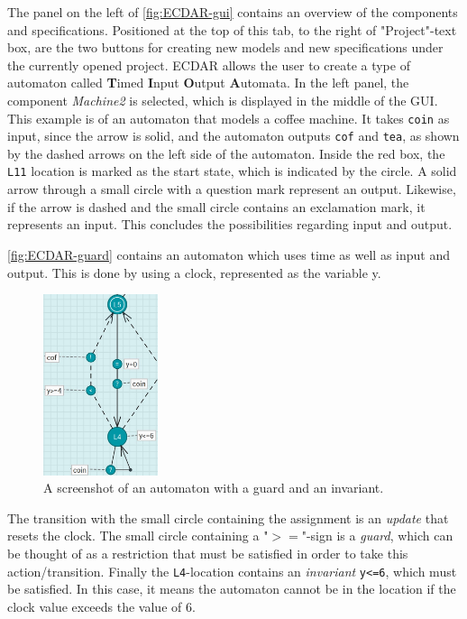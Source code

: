 The panel on the left of \autoref{fig:ECDAR-gui} contains an overview of the components and specifications. 
Positioned at the top of this tab, to the right of "Project"-text box, are the two buttons for creating new models and new specifications under the currently opened project.
ECDAR allows the user to create a type of automaton called \textbf{T}imed \textbf{I}nput \textbf{O}utput \textbf{A}utomata. 
In the left panel, the component \textit{Machine2} is selected, which is displayed in the middle of the GUI.
This example is of an automaton that models a coffee machine.
It takes \texttt{coin} as input, since the arrow is solid, and the automaton outputs \texttt{cof} and \texttt{tea}, as shown by the dashed arrows on the left side of the automaton.
Inside the red box, the \texttt{L11} location is marked as the start state, which is indicated by the circle.
A solid arrow through a small circle with a question mark represent an output. 
Likewise, if the arrow is dashed and the small circle contains an exclamation mark, it represents an input.
This concludes the possibilities regarding input and output.

\autoref{fig:ECDAR-guard} contains an automaton which uses time as well as input and output.
This is done by using a clock, represented as the variable y.
\begin{figure}[H]
    \centering
    \includegraphics[width=0.3\textwidth]{common/figures/ecdar-guards.jpg}
    \caption{A screenshot of an automaton with a guard and an invariant.}
    \label{fig:ECDAR-guard}
\end{figure}

The transition with the small circle containing the assignment is an \textit{update} that resets the clock.
The small circle containing a "$>=$"-sign is a \textit{guard}, which can be thought of as a restriction that must be satisfied in order to take this action/transition.
Finally the \texttt{L4}-location contains an \textit{invariant} \texttt{y<=6}, which must be satisfied. 
In this case, it means the automaton cannot be in the location if the clock value exceeds the value of 6.

